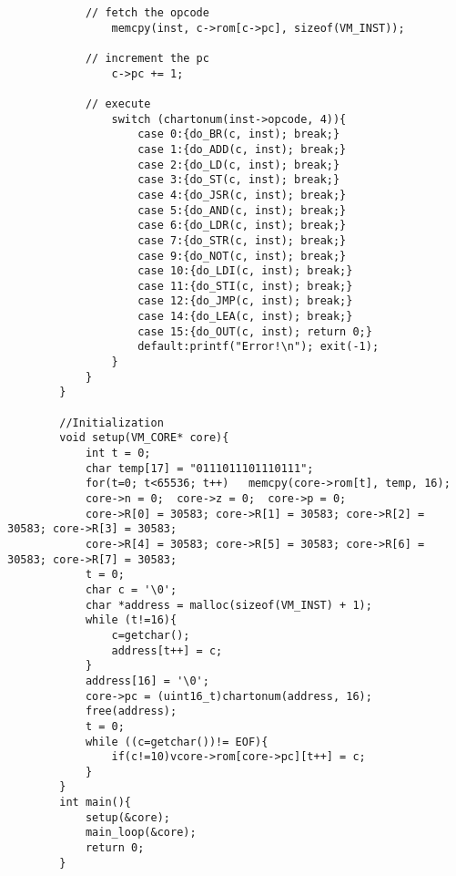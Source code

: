 \documentclass[20pt]{ctexart}
\begin{document}
\begin{verbatim}
            // fetch the opcode
                memcpy(inst, c->rom[c->pc], sizeof(VM_INST));

            // increment the pc 
                c->pc += 1;

            // execute
                switch (chartonum(inst->opcode, 4)){
                    case 0:{do_BR(c, inst); break;}
                    case 1:{do_ADD(c, inst); break;}
                    case 2:{do_LD(c, inst); break;}
                    case 3:{do_ST(c, inst); break;}
                    case 4:{do_JSR(c, inst); break;}
                    case 5:{do_AND(c, inst); break;}
                    case 6:{do_LDR(c, inst); break;}
                    case 7:{do_STR(c, inst); break;}
                    case 9:{do_NOT(c, inst); break;}
                    case 10:{do_LDI(c, inst); break;}
                    case 11:{do_STI(c, inst); break;}
                    case 12:{do_JMP(c, inst); break;}
                    case 14:{do_LEA(c, inst); break;}
                    case 15:{do_OUT(c, inst); return 0;}
                    default:printf("Error!\n"); exit(-1);
                }
            }
        }

        //Initialization
        void setup(VM_CORE* core){
            int t = 0;
            char temp[17] = "0111011101110111";
            for(t=0; t<65536; t++)   memcpy(core->rom[t], temp, 16);
            core->n = 0;  core->z = 0;  core->p = 0;
            core->R[0] = 30583; core->R[1] = 30583; core->R[2] = 30583; core->R[3] = 30583; 
            core->R[4] = 30583; core->R[5] = 30583; core->R[6] = 30583; core->R[7] = 30583;
            t = 0;
            char c = '\0';
            char *address = malloc(sizeof(VM_INST) + 1);
            while (t!=16){
                c=getchar();
                address[t++] = c;
            }
            address[16] = '\0';
            core->pc = (uint16_t)chartonum(address, 16);
            free(address);
            t = 0;
            while ((c=getchar())!= EOF){
                if(c!=10)vcore->rom[core->pc][t++] = c;
            }
        }
        int main(){
            setup(&core);
            main_loop(&core);
            return 0;
        }
\end{verbatim}
\end{document}
